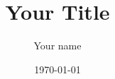 \documentclass[]{./DocumentClass/MasterThesis}
\title{Your Title}
\author{Your name}
\date{\today}
\begin{document}

\frontmatter

\mktitle



% 



% 

\newpage
\tableofcontents

\newpage
\listoffigures
\newpage
\listoftables


\mainmatter





\newpage


\appendix           %



\end{document}
